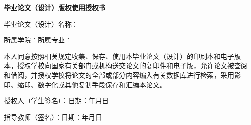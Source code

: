 \vspace{0.6cm}
\begin{center}
{\songti\bfseries \thesisUniversity 毕业论文（设计）版权使用授权书}
\end{center}
\vspace{0.3cm}
{\songti{}

\setlength{\parindent}{0pt}
毕业论文（设计）名称：\underline{\makebox[9.0cm][c]{\thesisTitleZhA}}

\vspace{0.2em}
\phantom{毕业论文（设计）名称：}\underline{\makebox[9.0cm][c]{\thesisTitleZhB}}

\vspace{0.4em}
所属学院：\underline{\makebox[4.3cm][c]{\thesisCollege}}\hspace{0.8em}所属专业：\underline{\makebox[4.3cm][c]{\thesisMajor}}

\vspace{0.6em}
\setlength{\parindent}{2em}
本人同意\thesisUniversity 按照相关规定收集、保存、使用本毕业论文（设计）的印刷本和电子版本，授权学校向国家有关部门或机构送交论文的复印件和电子版，允许论文被查阅和借阅，并授权学校将论文的全部或部分内容编入有关数据库进行检索，采用影印、缩印、数字化或其他复制手段保存和汇编本论文。

\vspace{0.7cm}
\setlength{\parindent}{0pt}
\hfill 授权人（学生签名）：\SignBox{2.8cm}{0.85cm}{\thesisAuthorSign}\hspace{0.6em}日期：\underline{\makebox[0.9cm]{\thesisSignYear}}年\underline{\makebox[0.7cm]{\thesisSignMonth}}月\underline{\makebox[0.7cm]{\thesisSignDay}}日

\vspace{0.5cm}
\hfill 指导教师（签名）：\SignBox{3.0cm}{0.7cm}{\thesisAdvisorSign}\hspace{0.6em}日期：\underline{\makebox[0.9cm]{\thesisSignYear}}年\underline{\makebox[0.7cm]{\thesisSignMonth}}月\underline{\makebox[0.7cm]{\thesisSignDay}}日
}
